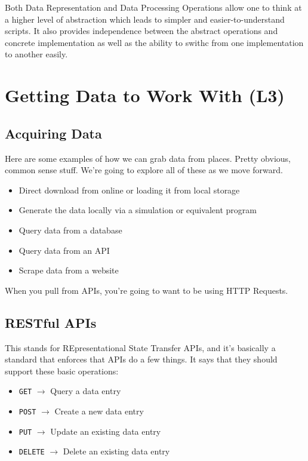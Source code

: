 \documentclass[english, 10pt]{article}
\begin{document}
Both Data Representation and Data Processing Operations allow one to think at a higher level of abstraction which leads to simpler and easier-to-understand scripts. It also provides independence between the abstract operations and concrete implementation as well as the ability to swithc from one implementation to another easily. 
\section{Getting Data to Work With (L3)}

\subsection{Acquiring Data}

Here are some examples of how we can grab data from places. Pretty obvious, common sense stuff. We're going to explore all of these as we move forward.

\begin{itemize}
	\item Direct download from online or loading it from local storage
	\item Generate the data locally via a simulation or equivalent program
	\item Query data from a database 
	\item Query data from an API
	\item Scrape data from a website
\end{itemize}

When you pull from APIs, you're going to want to be using HTTP Requests.

\subsection{RESTful APIs}

This stands for REpresentational State Transfer APIs, and it's basically a standard that enforces that APIs do a few things. It says that they should support these basic operations:

\begin{itemize}
	\item \texttt{GET} $\rightarrow$ Query a data entry
	\item \texttt{POST} $\rightarrow$ Create a new data entry
	\item \texttt{PUT} $\rightarrow$ Update an existing data entry
	\item \texttt{DELETE} $\rightarrow$ Delete an existing data entry
\end{itemize}
\end{document}
